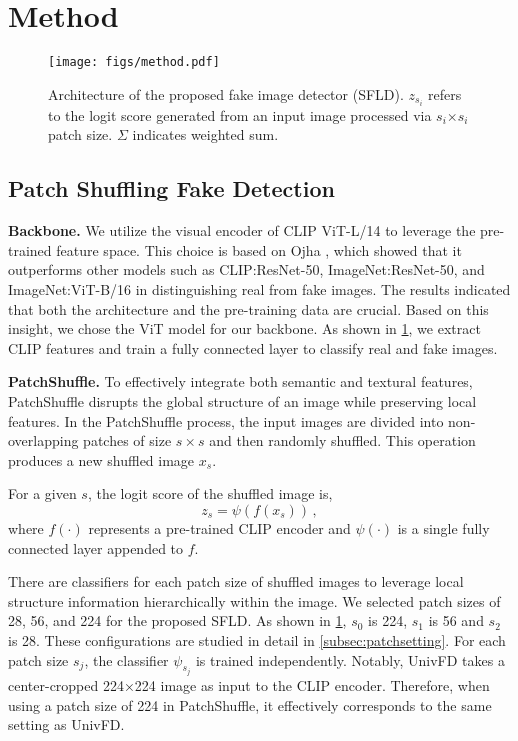 \section{Method}
\label{sec:method}


\begin{figure}[t]
     \centering
     \texttt{[image: figs/method.pdf]}
     \caption{Architecture of the proposed fake image detector (SFLD). $z_{s_i}$ refers to the logit score generated from an input image processed via $s_i\text{×}s_i$ patch size. $\Sigma$ indicates weighted sum.}
     \label{fig:method-architecture}
\end{figure}

\subsection{Patch Shuffling Fake Detection} 
\label{subsec:SFLD}
\textbf{Backbone.}
We utilize the visual encoder of CLIP ViT-L/14\cite{dosovitskiy2021an, CLIP} to leverage the pre-trained feature space. This choice is based on Ojha \etal\cite{ojha2023towards}, which showed that it outperforms other models such as CLIP:ResNet-50, ImageNet:ResNet-50, and ImageNet:ViT-B/16 in distinguishing real from fake images. The results indicated that both the architecture and the pre-training data are crucial. 
Based on this insight, we chose the ViT model for our backbone. 
As shown in \cref{fig:method-architecture}, we extract CLIP features and train a fully connected layer to classify real and fake images.


\textbf{PatchShuffle.}
To effectively integrate both semantic and textural features, PatchShuffle disrupts the global structure of an image while preserving local features.
In the PatchShuffle process, the input images are divided into non-overlapping patches of size $s \times s$ and then randomly shuffled. This operation produces a new shuffled image $x_s$.

For a given $s$, the logit score of the shuffled image is, 
\begin{equation}
    z_{s} = \psi(f(x_s)) \,,
\end{equation}
where $f( \cdot )$ represents a pre-trained CLIP encoder and $\psi(\cdot)$ is a single fully connected layer appended to $f$.

There are classifiers for each patch size of shuffled images to leverage local structure information hierarchically within the image.
We selected patch sizes of 28, 56, and 224 for the proposed SFLD.
As shown in \cref{fig:method-architecture}, $s_0$ is 224, $s_1$ is 56 and $s_2$ is 28.
These configurations are studied in detail in \cref{subsec:patchsetting}.
For each patch size $s_j$, the classifier $\psi_{s_j}$ is trained independently.
Notably, UnivFD takes a center-cropped 224×224 image as input to the CLIP encoder.
Therefore, when using a patch size of 224 in PatchShuffle, it effectively corresponds to the same setting as UnivFD\cite{ojha2023towards}.

